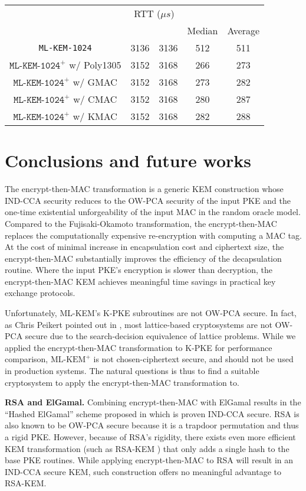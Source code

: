 \documentclass[journal=tches,submission]{iacrtrans}
\newcommand{\us}{\mu s}
\def\mlkemplus{\text{ML-KEM}^+}
\begin{document}
\begin{table}[h]
\begin{tabular}{|c|c|c|c|c|}
        & \multicolumn{2}{|c|}{RTT ($\us$)} \\
        \cline{4-5}
        & & & Median & Average \\
        \hline
        \texttt{ML-KEM-1024} & 3136 & 3136 & 512 & 511 \\
        \hline
        $\texttt{ML-KEM-1024}^+$ w/ Poly1305 & 3152 & 3168 & 266 & 273 \\
        \hline
        $\texttt{ML-KEM-1024}^+$ w/ GMAC & 3152 & 3168 & 273 & 282 \\
        \hline
        $\texttt{ML-KEM-1024}^+$ w/ CMAC & 3152 & 3168 & 280 & 287 \\
        \hline
        $\texttt{ML-KEM-1024}^+$ w/ KMAC & 3152 & 3168 & 282 & 288 \\
        \hline
    \end{tabular}
\end{table}

\section{Conclusions and future works}\label{sec:future-works}
The encrypt-then-MAC transformation is a generic KEM construction whose IND-CCA security reduces to the OW-PCA security of the input PKE and the one-time existential unforgeability of the input MAC in the random oracle model. Compared to the Fujisaki-Okamoto transformation, the encrypt-then-MAC replaces the computationally expensive re-encryption with computing a MAC tag. At the cost of minimal increase in encapsulation cost and ciphertext size, the encrypt-then-MAC substantially improves the efficiency of the decapsulation routine. Where the input PKE's encryption is slower than decryption, the encrypt-then-MAC KEM achieves meaningful time savings in practical key exchange protocols.

Unfortunately, ML-KEM's K-PKE subroutines are not OW-PCA secure. In fact, as Chris Peikert pointed out in \cite{DBLP:conf/pqcrypto/Peikert14}, most lattice-based cryptosystems are not OW-PCA secure due to the search-decision equivalence of lattice problems. While we applied the encrypt-then-MAC transformation to K-PKE for performance comparison, $\mlkemplus$ is not chosen-ciphertext secure, and should not be used in production systems. The natural questions is thus to find a suitable cryptosystem to apply the encrypt-then-MAC transformation to.

\textbf{RSA and ElGamal.} Combining encrypt-then-MAC with ElGamal results in the ``Hashed ElGamal'' scheme proposed in \cite{DBLP:journals/iacr/AbdallaBR99}\cite{DBLP:conf/ctrsa/AbdallaBR01} which is proven IND-CCA secure. RSA is also known to be OW-PCA secure because it is a trapdoor permutation and thus a rigid PKE. However, because of RSA's rigidity, there exists even more efficient KEM transformation (such as RSA-KEM \cite{DBLP:journals/iacr/Shoup01}) that only adds a single hash to the base PKE routines. While applying encrypt-then-MAC to RSA will result in an IND-CCA secure KEM, such construction offers no meaningful advantage to RSA-KEM.
\end{document}
